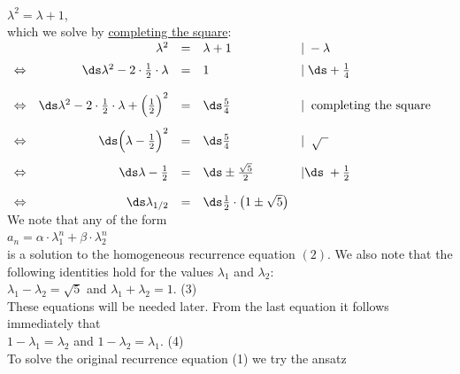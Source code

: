 \\[0.2cm]
\hspace*{1.3cm}
$\lambda^2 = \lambda + 1$,
\\[0.2cm]
which we solve by \href{https://en.wikipedia.org/wiki/Completing_the_square}{completing the square}:
\\[0.2cm]
\hspace*{1.3cm}
$\begin{array}{lrcll}
                &  \lambda^2 & = & \lambda + 1 & |\;- \lambda \\[0.2cm]
\Leftrightarrow & \ds \lambda^2 - 2 \cdot \frac{1}{2} \cdot\lambda & = & 1 & |\;\ds+ \frac{1}{4} \\[0.4cm]
\Leftrightarrow & \ds \lambda^2 - 2 \cdot \frac{1}{2} \cdot\lambda + \Big(\frac{1}{2}\Big)^2 & = & \ds\frac{5}{4}
                & | \;\; \mbox{completing the square}
                  \\[0.4cm]
\Leftrightarrow & \ds \Big(\lambda -\frac{1}{2}\Big)^2 & = & \ds\frac{5}{4}         & | \;\;\sqrt{\;\;} \\[0.4cm]
\Leftrightarrow & \ds \lambda -\frac{1}{2} & = & \ds\pm\frac{\sqrt{5}}{2} & | \ds\;+ \frac{1}{2} \\[0.4cm]
\Leftrightarrow & \ds \lambda_{1/2} & = & \ds\frac{1}{2} \cdot \bigl(1 \pm \sqrt{5}\bigr) & 
 \end{array}
 $
\\[0.2cm]
We note that any  of the form
\\[0.2cm]
\hspace*{1.3cm}
$a_n = \alpha \cdot \lambda_1^n + \beta \cdot \lambda_2^n$
\\[0.2cm]
is a solution to the homogeneous recurrence equation $(2)$.
We also note that the following identities hold for the values $\lambda_1$ and $\lambda_2$:
\\[0.2cm]
\hspace*{1.3cm} 
$\lambda_1 - \lambda_2 = \sqrt{5}$ \quad and \quad $\lambda_1 + \lambda_2 = 1$. \hspace*{\fill} (3)
\\[0.2cm]
These equations will be needed later.
From the last equation it follows immediately that \\[0.2cm]
\hspace*{1.3cm} $1 - \lambda_1 = \lambda_2$ \quad and \quad $1 - \lambda_2 = \lambda_1$. \hspace*{\fill} (4)
\\[0.1cm]
To solve the original recurrence equation (1) we try the ansatz
